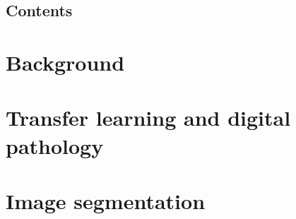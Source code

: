 % 
\pagestyle{empty}



\frontmatter

\begingroup

\makeatletter
\@twosidefalse
\makeatother




\endgroup

\chapter*{Contents}
\tableofcontents


\mainmatter
\pagestyle{thesisSimple}



\part{Background}



\part{Transfer learning and digital pathology}



\part{Image segmentation}



\backmatter

\appendix


\newpage

\listoffigures
\listoftables

\printbibliography

